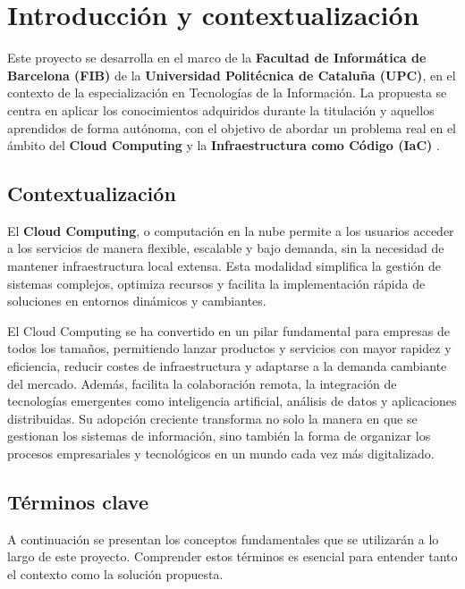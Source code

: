 \documentclass{article}
\begin{document}
    \newpage
    \renewcommand{\contentsname}{\Huge \textbf{ÍNDICE}}
    {\large
    \tableofcontents
    }

    \newpage
    \section{Introducción y contextualización}
    {                     
        \setlength{\parskip}{1em}

        \justify 
        Este proyecto se desarrolla en el marco de la \textbf{Facultad de Informática de Barcelona (FIB)} de la \textbf{Universidad Politécnica de Cataluña (UPC)}, en el contexto de la especialización en Tecnologías de la Información. La propuesta se centra en aplicar los conocimientos adquiridos durante la titulación y aquellos aprendidos de forma autónoma, con el objetivo de abordar un problema real en el ámbito del \textbf{Cloud Computing} \cite{noauthor_que_2024} y la \textbf{Infraestructura como Código (IaC)} \cite{noauthor_que_nodate-4}.

        \subsection{Contextualización}
        \justify
        
        El \textbf{Cloud Computing}, o computación en la nube permite a los usuarios acceder a los servicios de manera flexible, escalable y bajo demanda, sin la necesidad de mantener infraestructura local extensa. Esta modalidad simplifica la gestión de sistemas complejos, optimiza recursos y facilita la implementación rápida de soluciones en entornos dinámicos y cambiantes.

        \justify
        El Cloud Computing se ha convertido en un pilar fundamental para empresas de todos los tamaños, permitiendo lanzar productos y servicios con mayor rapidez y eficiencia, reducir costes de infraestructura y adaptarse a la demanda cambiante del mercado. Además, facilita la colaboración  remota, la integración de tecnologías emergentes como inteligencia artificial, análisis de datos y aplicaciones distribuidas. Su adopción creciente transforma no solo la manera en que se gestionan los sistemas de información, sino también la forma de organizar los procesos empresariales y tecnológicos en un mundo cada vez más digitalizado.

        \subsection{Términos clave}
        \justify
        A continuación se presentan los conceptos fundamentales que se utilizarán a lo largo de este proyecto. Comprender estos términos es esencial para entender tanto el contexto como la solución propuesta.
        
}
\end{document}
